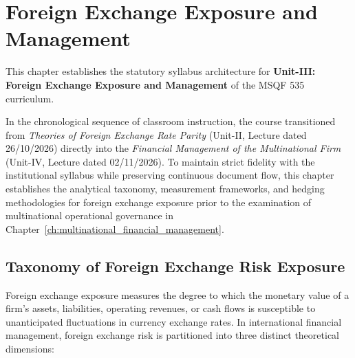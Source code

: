 \chapter{Foreign Exchange Exposure and Management}
\label{ch:foreign_exchange_exposure}

\begin{tcolorbox}[
    enhanced,
    colback=softblue!40,
    colframe=navyblue,
    arc=2mm,
    boxrule=1pt,
    title={\sffamily\bfseries\color{white}Curriculum Scope \& Course Sequencing Note (Unit-III)},
    attach boxed title to top left={yshift=-2mm, xshift=5mm},
    boxed title style={colback=navyblue, arc=1.5mm}
]
\small\sffamily
This chapter establishes the statutory syllabus architecture for \textbf{Unit-III: Foreign Exchange Exposure and Management} of the MSQF 535 curriculum. 

In the chronological sequence of classroom instruction, the course transitioned from \textit{Theories of Foreign Exchange Rate Parity} (Unit-II, Lecture dated 26/10/2026) directly into the \textit{Financial Management of the Multinational Firm} (Unit-IV, Lecture dated 02/11/2026). To maintain strict fidelity with the institutional syllabus while preserving continuous document flow, this chapter establishes the analytical taxonomy, measurement frameworks, and hedging methodologies for foreign exchange exposure prior to the examination of multinational operational governance in Chapter~\ref{ch:multinational_financial_management}.
\end{tcolorbox}

\vspace{0.5em}

\section{Taxonomy of Foreign Exchange Risk Exposure}
\label{sec:fx_exposure_taxonomy}

Foreign exchange exposure measures the degree to which the monetary value of a firm's assets, liabilities, operating revenues, or cash flows is susceptible to unanticipated fluctuations in currency exchange rates. In international financial management, foreign exchange risk is partitioned into three distinct theoretical dimensions:


